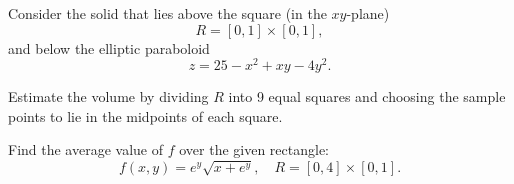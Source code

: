 \documentclass[12pt]{amsart}
\begin{document}
\begin{question}
	Consider the solid that lies above the square (in the $xy$-plane)
	\[
		R = [0,1] \times [0,1],
	\]
	and below the elliptic paraboloid
	\[
		z = 25 - x^2 + xy - 4y^2.
	\]

	\noindent
	Estimate the volume by dividing $R$ into 9 equal squares and choosing the sample points to lie in the midpoints of each square.
\end{question}
\vspace{7cm}

\begin{question}
	Find the average value of $f$ over the given rectangle:
	\[
		f(x, y) = e^y \sqrt{x + e^y}, \quad R = [0,4] \times [0,1].
	\]
\end{question}
\vspace{7cm}
\end{document}
